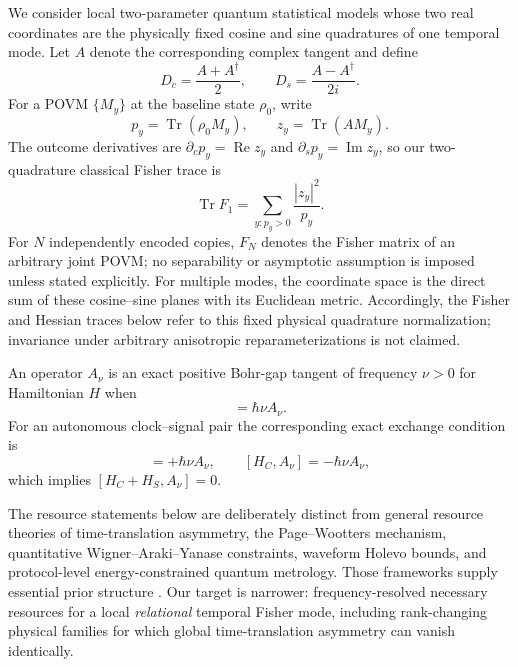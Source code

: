 \documentclass[aps,pra,preprint,nofootinbib]{revtex4-2}
\newcommand{\Tr}{\operatorname{Tr}}
\newcommand{\rhozero}{\rho_0}
\newcommand{\Fcl}{F}
\begin{document}
We consider local two-parameter quantum statistical models whose two real coordinates are the physically fixed cosine and sine quadratures of one temporal mode. Let $A$ denote the corresponding complex tangent and define
\begin{equation}
D_c=\frac{A+A^\dagger}{2},\qquad
D_s=\frac{A-A^\dagger}{2i}.
\label{eq:quadratures}
\end{equation}
For a POVM $\{M_y\}$ at the baseline state $\rhozero$, write
\begin{equation}
p_y=\Tr(\rhozero M_y),\qquad z_y=\Tr(A M_y).
\end{equation}
The outcome derivatives are $\partial_c p_y=\operatorname{Re}z_y$ and $\partial_s p_y=\operatorname{Im}z_y$, so our two-quadrature classical Fisher trace is
\begin{equation}
\Tr \Fcl_1=\sum_{y:p_y>0}\frac{|z_y|^2}{p_y}.
\label{eq:FItrace}
\end{equation}
For $N$ independently encoded copies, $\Fcl_N$ denotes the Fisher matrix of an arbitrary joint POVM; no separability or asymptotic assumption is imposed unless stated explicitly. For multiple modes, the coordinate space is the direct sum of these cosine--sine planes with its Euclidean metric. Accordingly, the Fisher and Hessian traces below refer to this fixed physical quadrature normalization; invariance under arbitrary anisotropic reparameterizations is not claimed.

An operator $A_\nu$ is an exact positive Bohr-gap tangent of frequency $\nu>0$ for Hamiltonian $H$ when
\begin{equation}
[H,A_\nu]=\hbar\nu A_\nu.
\label{eq:bohrgap}
\end{equation}
For an autonomous clock--signal pair the corresponding exact exchange condition is
\begin{equation}
[H_S,A_\nu]=+\hbar\nu A_\nu,
\qquad
[H_C,A_\nu]=-\hbar\nu A_\nu,
\label{eq:exchange}
\end{equation}
which implies $[H_C+H_S,A_\nu]=0$.

The resource statements below are deliberately distinct from general resource theories of time-translation asymmetry, the Page--Wootters mechanism, quantitative Wigner--Araki--Yanase constraints, waveform Holevo bounds, and protocol-level energy-constrained quantum metrology. Those frameworks supply essential prior structure \cite{PageWootters1983,MarvianSpekkens2014Modes,CarmoSoaresPinto2021,TajimaShiraishiSaito2020,Marvian2022,YamaguchiTajima2023,GardnerEtAl2024,ChenYang2026}. Our target is narrower: frequency-resolved necessary resources for a local \emph{relational} temporal Fisher mode, including rank-changing physical families for which global time-translation asymmetry can vanish identically.
\end{document}
